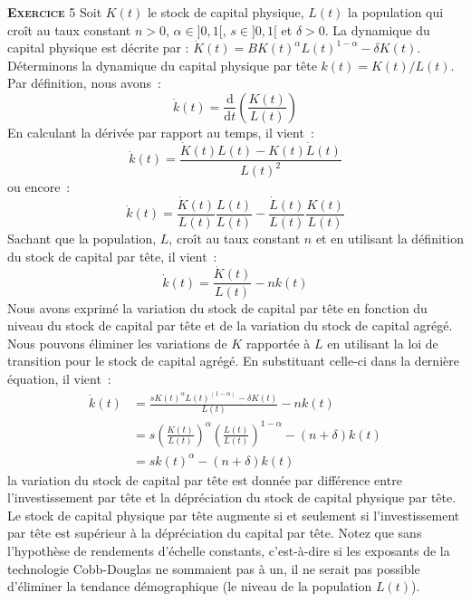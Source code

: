 \documentclass[10pt,a4paper,notitlepage]{report}
\newcommand{\exercice}[1]{\textsc{\textbf{Exercice}} #1}
\begin{document}
\exercice{5}  Soit $K(t)$  le  stock de  capital  physique, $L(t)$  la
population qui  croît au taux  constant $n>0$, $\alpha \in  ]0,1[$, $s
\in  ]0,1[$  et $\delta>0$.   La  dynamique  du capital  physique  est
décrite par  : $\dot{K}(t)=BK(t)^{\alpha}L(t)^{1-\alpha}-\delta K(t)$.
Déterminons   la    dynamique   du    capital   physique    par   tête
$k(t)=K(t)/L(t)$. Par définition, nous avons :
\[
\dot k(t) = \frac{\mathrm d}{\mathrm dt} \left(\frac{K(t)}{L(t)}\right)
\]
En calculant la dérivée par rapport au temps, il vient :
\[
\dot k(t) = \frac{\dot K(t)L(t)-K(t)\dot L(t)}{L(t)^2}
\]
ou encore :
\[
\dot k(t) = \frac{\dot K(t)}{L(t)}\frac{L(t)}{L(t)} - \frac{\dot L(t)}{L(t)}\frac{K(t)}{L(t)}
\]
Sachant  que la  population, $L$,  croît au  taux constant  $n$ et  en
utilisant la définition du stock de capital par tête, il vient :
\[
\dot k(t) = \frac{\dot K(t)}{L(t)} - nk(t)
\]
Nous avons exprimé la variation du stock de capital par tête en fonction du niveau du stock de capital par tête et de la variation du stock de capital agrégé. Nous pouvons éliminer les variations de $K$ rapportée à $L$ en utilisant la loi de transition pour le stock de capital agrégé. En substituant celle-ci dans la dernière équation, il vient :
\[
\begin{split}
\dot k(t) &= \frac{sK(t)^{\alpha}L(t)^{(1-\alpha)}-\delta K(t)}{L(t)} - nk(t)\\
  &= s\left(\frac{K(t)}{L(t)}\right)^{\alpha}\left(\frac{L(t)}{L(t)}\right)^{1-\alpha} - (n+\delta)k(t)\\
  &= sk(t)^{\alpha} - (n+\delta)k(t)
\end{split}
\]
la variation du stock de capital par tête est donnée par différence entre l'investissement par tête et la dépréciation du stock de capital physique par tête. Le stock de capital physique par tête augmente si et seulement si l'investissement par tête est supérieur à la dépréciation du capital par tête. Notez que sans l'hypothèse de rendements d'échelle constants, c'est-à-dire si les exposants de la technologie Cobb-Douglas ne sommaient pas à un, il ne serait pas possible d'éliminer la tendance démographique (le niveau de la population $L(t)$).
\end{document}
